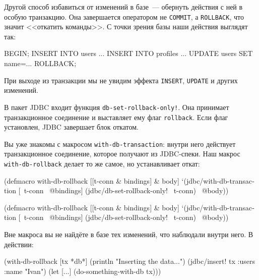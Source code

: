 Другой способ избавиться от изменений в базе~--- обернуть действия с ней в
особую транзакцию. Она завершается оператором не \verb|COMMIT|, а
\verb|ROLLBACK|, что значит <<откатить команды>>. С точки зрения базы наши
действия выглядят так:

\begin{english}
  \begin{sql}
BEGIN;
INSERT INTO users ...
INSERT INTO profiles ...
UPDATE users SET name=...
ROLLBACK;
  \end{sql}
\end{english}

При выходе из транзакции мы не увидим эффекта \verb|INSERT|, \verb|UPDATE| и
других изменений.

В пакет JDBC входит функция \texttt{db-set-roll\-back-only!}. Она принимает
транзакционное соединение и выставляет ему флаг \verb|rollback|. Если флаг
установлен, JDBC завершает блок откатом.


Вы уже знакомы с макросом \texttt{with-db-tran\-saction}: внутри него действует
транзакционное соединение, которое получают из JDBC-спеки. Наш макрос
\verb|with-db-rollback| делает то же самое, но устанавливает откат:

\ifnarrow

\begin{english}
  \begin{clojure}
(defmacro with-db-rollback
  [[t-conn & bindings] & body]
  `(jdbc/with-db-transaction
     [~t-conn ~@bindings]
     (jdbc/db-set-rollback-only!
       ~t-conn)
     ~@body))
  \end{clojure}
\end{english}

\else

\begin{english}
  \begin{clojure}
(defmacro with-db-rollback
  [[t-conn & bindings] & body]
  `(jdbc/with-db-transaction [~t-conn ~@bindings]
     (jdbc/db-set-rollback-only! ~t-conn)
     ~@body))
  \end{clojure}
\end{english}

\fi

Вне макроса вы не найдёте в базе тех изменений, что наблюдали внутри него. В
действии:

\ifnarrow

\begin{english}
  \begin{clojure}
(with-db-rollback [tx *db*]
  (println "Inserting the data...")
  (jdbc/insert! tx
    :users {:name "Ivan"})
  (let [...]
    (do-something-with-db tx)))
  \end{clojure}
\end{english}

